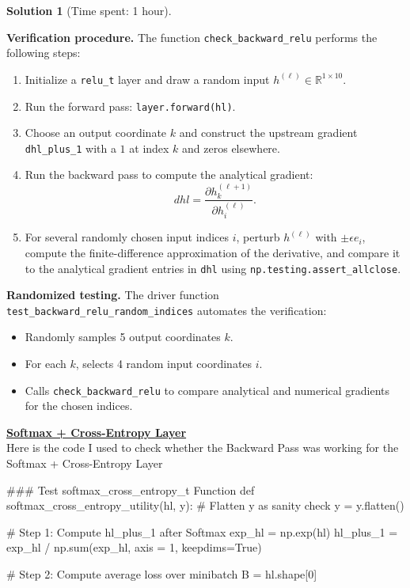 \documentclass[11pt, reqno, letterpaper, twoside]{amsart}
\theoremstyle{plain}
\theoremstyle{definition}
\newtheorem{solution}[theorem]{Solution}
\begin{document}
\begin{solution}[Time spent: 1 hour]
\begin{enumerate}
\textbf{Verification procedure.} 
The function \verb|check_backward_relu| performs the following steps:
\begin{enumerate}
  \item Initialize a \verb|relu_t| layer and draw a random input $h^{(\ell)} \in \mathbb{R}^{1 \times 10}$.
  \item Run the forward pass: \verb|layer.forward(hl)|.
  \item Choose an output coordinate $k$ and construct the upstream gradient \verb|dhl_plus_1| with a $1$ at index $k$ and zeros elsewhere.
  \item Run the backward pass to compute the analytical gradient:
  \[
  dhl = \frac{\partial h^{(\ell+1)}_{k}}{\partial h^{(\ell)}_{i}}.
  \]
  \item For several randomly chosen input indices $i$, perturb $h^{(\ell)}$ with $\pm \epsilon e_i$, compute the finite-difference approximation of the derivative, and compare it to the analytical gradient entries in \verb|dhl| using \verb|np.testing.assert_allclose|. \\
\end{enumerate}

\textbf{Randomized testing.}
The driver function \verb|test_backward_relu_random_indices| automates the verification:
\begin{itemize}
  \item Randomly samples 5 output coordinates $k$.
  \item For each $k$, selects 4 random input coordinates $i$.
  \item Calls \verb|check_backward_relu| to compare analytical and numerical gradients for the chosen indices. \\
\end{itemize}


\textbf{\underline{Softmax + Cross-Entropy Layer}} \\
Here is the code I used to check whether the Backward Pass was working for the Softmax + Cross-Entropy Layer
\begin{python}
    ### Test softmax_cross_entropy_t Function
def softmax_cross_entropy_utility(hl, y):
    # Flatten y as sanity check 
    y = y.flatten()

    # Step 1: Compute hl_plus_1 after Softmax
    exp_hl = np.exp(hl)
    hl_plus_1 = exp_hl / np.sum(exp_hl, axis = 1, keepdims=True)
    
    # Step 2: Compute average loss over minibatch 
    B = hl.shape[0]


\end{python}
\end{enumerate}
\end{solution}
\end{document}
